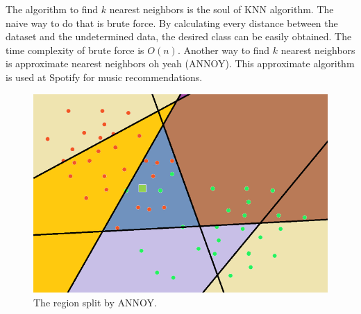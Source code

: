 \documentclass[twocolumn,10pt]{article}
\begin{document}
  The algorithm to find $k$ nearest neighbors is the soul of KNN algorithm. The naive way to do that is brute force. By calculating every 
  distance between the dataset and the undetermined data, the desired class can be easily obtained. The time complexity of brute force is $O(n)$. 
  Another way to find $k$ nearest neighbors is approximate nearest neighbors oh yeah (ANNOY). This approximate algorithm is used at Spotify 
  for music recommendations. 
  \begin{figure}[htb]
    \centering
    \includegraphics[scale=0.5]{assets/ANNOY-split.png}
    \caption{The region split by ANNOY.}
    \label{fig:ANNOY_split}
  \end{figure}
\end{document}
